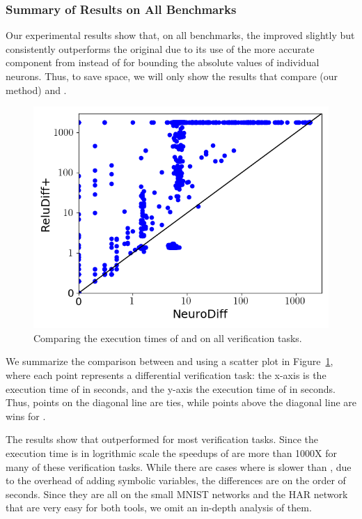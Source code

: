 \subsubsection{Summary of Results on All Benchmarks}


Our experimental results show that, on all benchmarks, the
improved \ReluDiffP{} slightly but consistently outperforms the
original \ReluDiff{} due to its use of the more accurate component
from \Neurify{} instead of \ReluVal{} for bounding the absolute values
of individual neurons.  Thus, to save space, we will only show the
results that compare \Name{} (our method) and \ReluDiffP{}.


\begin{figure}
\centering
\includegraphics[width=0.7\linewidth]{neurodiff/figs/exp_summary.png}
\caption{Comparing the execution times of \Name{} and \ReluDiffP{} on all verification tasks.}
\label{neurodiff:fig:expsummary}
\end{figure}


We summarize the comparison between \Name{} and \ReluDiffP{} using a
scatter plot in Figure~\ref{neurodiff:fig:expsummary}, where each point
represents a differential verification task: the x-axis is the
execution time of \Name{} in seconds, and the y-axis the execution
time of \ReluDiffP{} in seconds.  Thus, points on the diagonal line
are ties, while points above the diagonal line are wins for \Name{}.


The results show that \Name{} outperformed \ReluDiffP{} for most
verification tasks.  Since the execution time is in logrithmic scale
 the speedups of \Name{} are more
than 1000X for many of these verification tasks.
%
While there are cases where \Name{} is slower than \ReluDiffP{}, due
to the overhead of adding symbolic variables, the differences are on the
order of seconds.  Since they are all on the small MNIST networks and the
HAR network that are very easy for both tools, we omit
an in-depth analysis of them.


